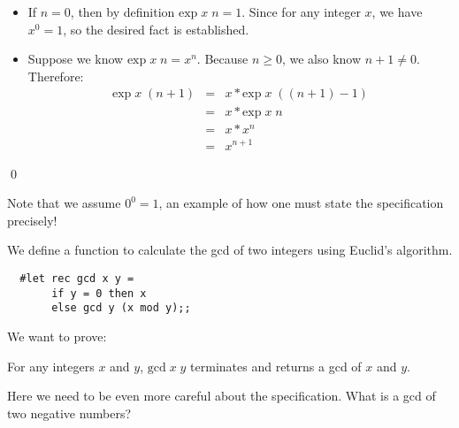 \begin{slide*}


\vspace*{0.5cm}

\begin{itemize}

\item If {\red $n = 0$}, then by definition {\red $\mbox{exp}\; x\; n = 1$}.
Since for any integer {\red $x$}, we have {\red $x^0 = 1$}, so the desired fact
is established.

\item Suppose we know {\red $\mbox{exp}\; x\; n = x^n$}. Because {\red $n \geq
0$}, we also know {\red $n + 1 \not= 0$}. Therefore:
{\red
\begin{eqnarray*}
\mbox{exp}\; x\; (n + 1)   & = & x * \mbox{exp}\; x\; ((n + 1) - 1)     \\
                           & = & x * \mbox{exp}\; x\; n                 \\
                           & = & x * x^n                                \\
                           & = & x^{n + 1}
\end{eqnarray*}}
\end{itemize}
\qed

Note that we assume {\red $0^0 = 1$}, an example of how one must state the
specification precisely!


\end{slide*}



\begin{slide*}


\vspace*{0.5cm}

We define a function to calculate the gcd of two integers using Euclid's
algorithm.

\begin{black}\begin{verbatim}
  #let rec gcd x y =
       if y = 0 then x
       else gcd y (x mod y);;
\end{verbatim}\end{black}

We want to prove:

{\red For any integers $x$ and $y$, $\mbox{gcd}\; x\; y$ terminates and returns
a gcd of $x$ and $y$.}

Here we need to be even more careful about the specification. What is a gcd of
two negative numbers?

\end{slide*}




